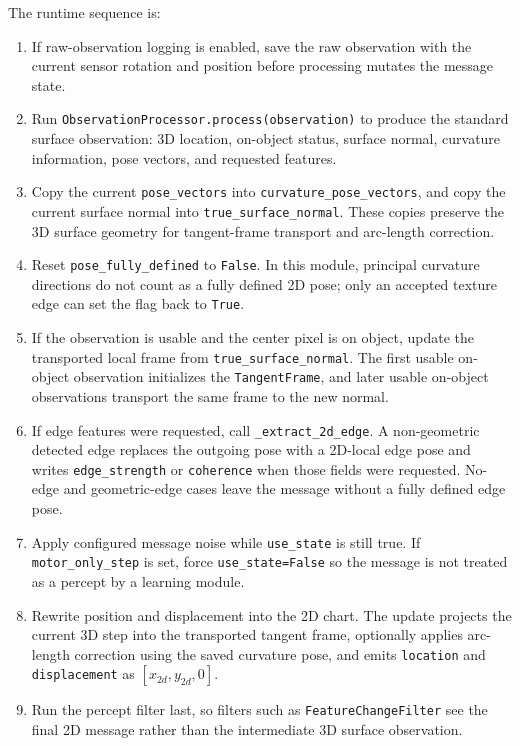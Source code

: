 \documentclass{article}
\begin{document}
The runtime sequence is:
\begin{enumerate}
  \item If raw-observation logging is enabled, save the raw observation with the current sensor rotation and position before processing mutates the message state.
  \item Run \texttt{ObservationProcessor.process(observation)} to produce the standard surface observation: 3D location, on-object status, surface normal, curvature information, pose vectors, and requested features.
  \item Copy the current \texttt{pose\_vectors} into \texttt{curvature\_pose\_vectors}, and copy the current surface normal into \texttt{true\_surface\_normal}. These copies preserve the 3D surface geometry for tangent-frame transport and arc-length correction.
  \item Reset \texttt{pose\_fully\_defined} to \texttt{False}. In this module, principal curvature directions do not count as a fully defined 2D pose; only an accepted texture edge can set the flag back to \texttt{True}.
  \item If the observation is usable and the center pixel is on object, update the transported local frame from \texttt{true\_surface\_normal}. The first usable on-object observation initializes the \texttt{TangentFrame}, and later usable on-object observations transport the same frame to the new normal.
  \item If edge features were requested, call \texttt{\_extract\_2d\_edge}. A non-geometric detected edge replaces the outgoing pose with a 2D-local edge pose and writes \texttt{edge\_strength} or \texttt{coherence} when those fields were requested. No-edge and geometric-edge cases leave the message without a fully defined edge pose.
  \item Apply configured message noise while \texttt{use\_state} is still true. If \texttt{motor\_only\_step} is set, force \texttt{use\_state=False} so the message is not treated as a percept by a learning module.
  \item Rewrite position and displacement into the 2D chart. The update projects the current 3D step into the transported tangent frame, optionally applies arc-length correction using the saved curvature pose, and emits \texttt{location} and \texttt{displacement} as \([x_{2d}, y_{2d}, 0]\).
  \item Run the percept filter last, so filters such as \texttt{FeatureChangeFilter} see the final 2D message rather than the intermediate 3D surface observation.
\end{enumerate}
\end{document}
